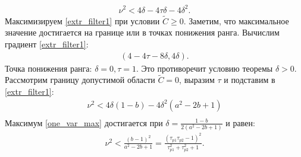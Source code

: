 \documentclass[a4paper,article,14pt]{extarticle}
\begin{document}
\begin{equation}\label{extr_filter1}
 \begin{aligned}
\nu^2 < 4\delta-4\tau\delta - 4\delta^2.
 \end{aligned}
\end{equation}
Максимизируем \eqref{extr_filter1} при условии $\widetilde C \geqslant 0$.  Заметим, что максимальное значение достигается на границе или в точках понижения ранга. Вычислим градиент \eqref{extr_filter1}:
\begin{equation}
 \begin{aligned}
(4 - 4\tau - 8\delta, 4\delta).
 \end{aligned}
\end{equation} 
Точка понижения ранга: $\delta = 0, \tau = 1$. Это противоречит условию теоремы $\delta > 0$. Рассмотрим границу допустимой области $\widetilde C = 0$, выразим $\tau$ и подставим в \eqref{extr_filter1}:
\begin{equation}\label{one_var_max}
 \begin{aligned}
\nu^2 < 4\delta(1 - b) - 4\delta^2(a^2 -2b +1)\\
 \end{aligned}
\end{equation} 
Максимум  \eqref{one_var_max} достигается при $\delta = \frac{1-b}{2(a^2 - 2b + 1)}$ и равен:
\begin{equation}\label{filter1_max}
 \begin{aligned}
\nu^2 < \frac{(b - 1)^2}{a^2 - 2b + 1} = \frac{(\tau_{p1}\tau_{p2} - 1)^2}{\tau_{p1}^2 + \tau_{p2}^2 + 1}.
 \end{aligned}
\end{equation} 
\end{document}
